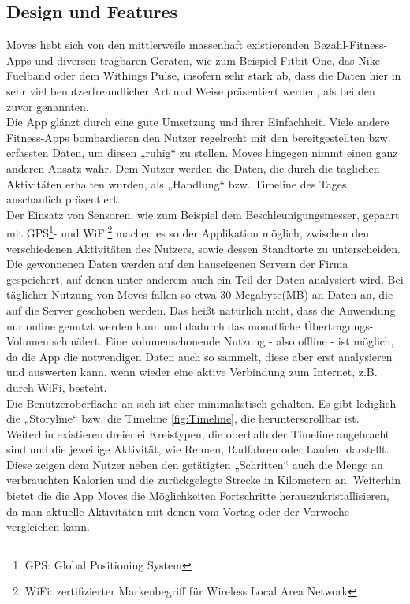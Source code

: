 \subsection{Design und Features}
\label{ch:Apps:sec:Moves:subsec:DuF}

Moves hebt sich von den mittlerweile massenhaft existierenden Bezahl-Fitness-Apps und diversen tragbaren Geräten, wie zum Beispiel Fitbit One, das Nike Fuelband oder dem Withings Pulse, insofern sehr stark ab, dass die Daten hier in sehr viel benutzerfreundlicher Art und Weise präsentiert werden, als bei den zuvor genannten.
\\
Die App glänzt durch eine gute Umsetzung und ihrer Einfachheit. 
Viele andere Fitness-Apps bombardieren den Nutzer regelrecht mit den bereitgestellten bzw. erfassten Daten, um diesen „ruhig“ zu stellen. 
Moves hingegen nimmt einen ganz anderen Ansatz wahr. 
Dem Nutzer werden die Daten, die durch die täglichen Aktivitäten erhalten wurden, als „Handlung“ bzw. Timeline des Tages anschaulich präsentiert.
\\
Der Einsatz von Sensoren, wie zum Beispiel dem Beschleunigungsmesser, gepaart mit GPS\footnote[1]{GPS: Global Positioning System}- und WiFi\footnote[2]{WiFi: zertifizierter Markenbegriff für Wireless Local Area Network} machen es so der Applikation möglich, zwischen den verschiedenen Aktivitäten des Nutzers, sowie dessen Standtorte zu unterscheiden. 
Die gewonnenen Daten werden auf den hauseigenen Servern der Firma gespeichert, auf denen unter anderem auch ein Teil der Daten analysiert wird. 
Bei täglicher Nutzung von Moves fallen so etwa 30 Megabyte(MB) an Daten an, die auf die Server geschoben werden. 
Das heißt natürlich nicht, dass die Anwendung nur online genutzt werden kann und dadurch das monatliche Übertragungs-Volumen schmälert. 
Eine volumenschonende Nutzung - also offline - ist möglich, da die App die notwendigen Daten auch so sammelt, diese aber erst analysieren und auswerten kann, wenn wieder eine aktive Verbindung zum Internet, z.B. durch WiFi, besteht.   
\\
Die Benutzeroberfläche an sich ist eher minimalistisch gehalten. 
Es gibt lediglich die „Storyline“ bzw. die Timeline \ref{fig:Timeline}, die herunterscrollbar ist. 
Weiterhin existieren dreierlei Kreistypen, die oberhalb der Timeline angebracht sind und die jeweilige Aktivität, wie Rennen, Radfahren oder Laufen, darstellt. 
Diese zeigen dem Nutzer neben den getätigten „Schritten“ auch die Menge an verbrauchten Kalorien und die zurückgelegte Strecke in Kilometern an. 
Weiterhin bietet die die App Moves die Möglichkeiten Fortschritte herauszukristallisieren, da man aktuelle Aktivitäten mit denen vom Vortag oder der Vorwoche vergleichen kann.   
\\

